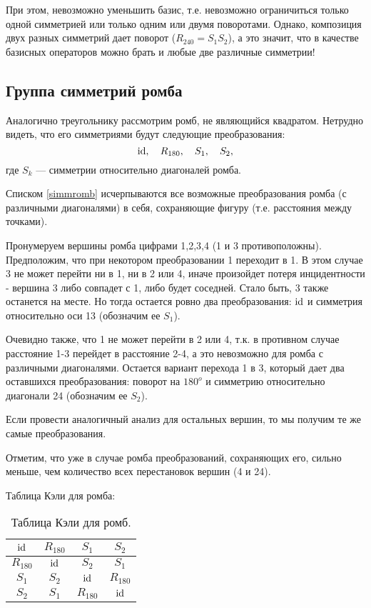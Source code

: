При этом, невозможно уменьшить базис, т.е. невозможно ограничиться только одной симметрией или только одним или двумя поворотами. Однако, композиция двух разных симметрий дает поворот ($R_{240}=S_1S_2$), а это значит, что в качестве базисных операторов можно брать и любые две различные симметрии!



\subsection{Группа симметрий ромба}

Аналогично треугольнику рассмотрим ромб, не являющийся квадратом. Нетрудно видеть, что его симметриями будут следующие преобразования:
\begin{equation}\label{simmromb}
\mathrm{id},\quad R_{180},\quad S_1,\quad S_2,
\end{equation}
где $S_k$ --- симметрии относительно диагоналей ромба.

\begin{thrm}
Списком \eqref{simmromb} исчерпываются все возможные преобразования ромба (с различными диагоналями) в себя, сохраняющие фигуру (т.е. расстояния между точками).
\end{thrm}
\pf
Пронумеруем вершины ромба цифрами 1,2,3,4 (1 и 3 противоположны). Предположим, что при некотором преобразовании 1 переходит в 1. В этом случае 3 не может перейти ни в 1, ни в 2 или 4, иначе произойдет потеря инцидентности - вершина 3 либо совпадет с 1, либо будет соседней. Стало быть, 3 также останется на месте. Но тогда остается ровно два преобразования: $\mathrm{id}$ и симметрия относительно оси 13 (обозначим ее $S_1$).

Очевидно также, что 1 не может перейти в 2 или 4, т.к. в противном случае расстояние 1-3 перейдет в расстояние 2-4, а это невозможно для ромба с различными диагоналями. Остается вариант перехода 1 в 3, который дает два оставшихся преобразования: поворот на $180^o$ и симметрию относительно диагонали 24 (обозначим ее $S_2$).

Если провести аналогичный анализ для остальных вершин, то мы получим те же самые преобразования.
\epf

Отметим, что уже в случае ромба преобразований, сохраняющих его, сильно меньше, чем количество всех перестановок вершин (4 и 24).

Таблица Кэли для ромба:
\begin{table}[htb!]\begin{center}
\begin{tabular}{c|c|c|c|}
$\mathrm{id}$     & $R_{180}$ & $S_1$ & $S_2$ \\
\hline
$R_{180}$ & $\mathrm{id}$     & $S_2$ & $S_1$ \\
\hline
$S_1$     & $S_2$     & $\mathrm{id}$ & $R_{180}$ \\
\hline
$S_2$     & $S_1$     & $R_{180}$ & $\mathrm{id}$ \\
\hline
\end{tabular}
\caption{Таблица Кэли для ромб.}\label{rombus}
\end{center}\end{table}

